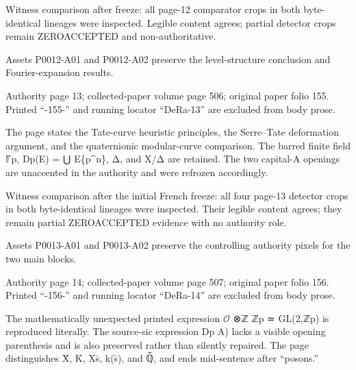 \documentclass[11pt,a4paper]{article}
\begin{document}
Witness comparison after freeze: all page-12 comparator crops in both byte-identical lineages were inspected. Legible content agrees; partial detector crops remain ZERO\textunderscore{}ACCEPTED and non-authoritative.

Assets P0012-A01 and P0012-A02 preserve the level-structure conclusion and Fourier-expansion results.


\par\medskip
\hypertarget{D018-P0013}{}
\par\smallskip
Authority page 13; collected-paper volume page 506; original paper folio 155. Printed “-155-” and running locator “DeRa-13” are excluded from body prose.

The page states the Tate-curve heuristic principles, the Serre–Tate deformation argument, and the quaternionic modular-curve comparison. The barred finite field \ensuremath{\mathbb{F}}̄\textunderscore{}p, D\textunderscore{}p(E) = ⋃ E\textunderscore{}\{p\textasciicircum{}n\}, Δ, and X/Δ are retained. The two capital-A openings are unaccented in the authority and were refrozen accordingly.

Witness comparison after the initial French freeze: all four page-13 detector crops in both byte-identical lineages were inspected. Their legible content agrees; they remain partial ZERO\textunderscore{}ACCEPTED evidence with no authority role.

Assets P0013-A01 and P0013-A02 preserve the controlling authority pixels for the two main blocks.


\par\medskip
\hypertarget{D018-P0014}{}
\par\smallskip
Authority page 14; collected-paper volume page 507; original paper folio 156. Printed “-156-” and running locator “DeRa-14” are excluded from body prose.

The mathematically unexpected printed expression \ensuremath{\mathcal{O}} ⊗\textunderscore{}ℤ ℤ\textunderscore{}p ≃ GL(2,ℤ\textunderscore{}p) is reproduced literally. The source-sic expression D\textunderscore{}p A) lacks a visible opening parenthesis and is also preserved rather than silently repaired. The page distinguishes X̄, K̄, X\textunderscore{}s̄, k(s̄), and ℚ̄, and ends mid-sentence after “posons.”
\end{document}
